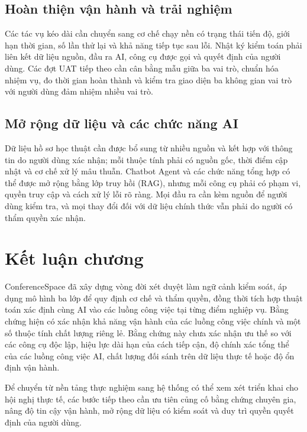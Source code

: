 \subsection{Hoàn thiện vận hành và trải nghiệm}

Các tác vụ kéo dài cần chuyển sang cơ chế chạy nền có trạng thái tiến độ, giới hạn thời gian, số lần thử lại và khả năng tiếp tục sau lỗi. Nhật ký kiểm toán phải liên kết dữ liệu nguồn, đầu ra AI, công cụ được gọi và quyết định của người dùng. Các đợt UAT tiếp theo cần cân bằng mẫu giữa ba vai trò, chuẩn hóa nhiệm vụ, đo thời gian hoàn thành và kiểm tra giao diện ba không gian vai trò với người dùng đảm nhiệm nhiều vai trò.

\subsection{Mở rộng dữ liệu và các chức năng AI}

Dữ liệu hồ sơ học thuật cần được bổ sung từ nhiều nguồn và kết hợp với thông tin do người dùng xác nhận; mỗi thuộc tính phải có nguồn gốc, thời điểm cập nhật và cơ chế xử lý mâu thuẫn. Chatbot Agent và các chức năng tổng hợp có thể được mở rộng bằng lớp truy hồi (RAG), nhưng mỗi công cụ phải có phạm vi, quyền truy cập và cách xử lý lỗi rõ ràng. Mọi đầu ra cần kèm nguồn để người dùng kiểm tra, và mọi thay đổi đối với dữ liệu chính thức vẫn phải do người có thẩm quyền xác nhận.

\section{Kết luận chương}

ConferenceSpace đã xây dựng vòng đời xét duyệt làm ngữ cảnh kiểm soát, áp dụng mô hình ba lớp để quy định cơ chế và thẩm quyền, đồng thời tích hợp thuật toán xác định cùng AI vào các luồng công việc tại từng điểm nghiệp vụ. Bằng chứng hiện có xác nhận khả năng vận hành của các luồng công việc chính và một số thuộc tính chất lượng riêng lẻ. Bằng chứng này chưa xác nhận ưu thế so với các công cụ độc lập, hiệu lực dài hạn của cách tiếp cận, độ chính xác tổng thể của các luồng công việc AI, chất lượng đối sánh trên dữ liệu thực tế hoặc độ ổn định vận hành.

Để chuyển từ nền tảng thực nghiệm sang hệ thống có thể xem xét triển khai cho hội nghị thực tế, các bước tiếp theo cần ưu tiên củng cố bằng chứng chuyên gia, nâng độ tin cậy vận hành, mở rộng dữ liệu có kiểm soát và duy trì quyền quyết định của người dùng.
